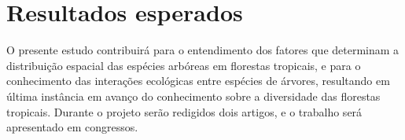 \documentclass[twoside,12pt,a4paper]{report}
\begin{document}
\section{Resultados esperados}
O presente estudo contribuirá para o entendimento dos fatores que determinam a distribuição espacial
das espécies arbóreas em florestas tropicais, e para o conhecimento das interações ecológicas entre
espécies de árvores, resultando em última instância em avanço do conhecimento sobre a diversidade
das florestas tropicais. Durante o projeto serão redigidos dois artigos, e o trabalho será apresentado
em congressos.



    
    
\end{document}
